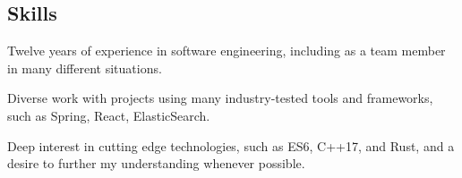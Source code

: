 \documentclass[letterpaper]{article}
\begin{document}
\begin{multicols}{2}
\section*{Skills}

Twelve years of experience in software engineering, including as a team member
in many different situations. 

Diverse work with projects using many industry-tested tools and frameworks, such
as Spring, React, ElasticSearch.

Deep interest in cutting edge technologies, such as ES6, C++17, and Rust, and a
desire to further my understanding whenever possible.
\end{multicols}
\end{document}
